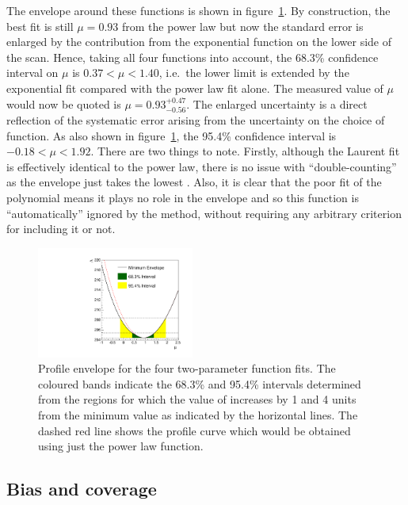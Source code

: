 The envelope around these functions is shown in
figure~\ref{fig:functions:envelope}.
By construction, the best fit is still $\mu=0.93$ from the power law
but now the standard error is enlarged by the contribution from the exponential function
on the lower side of the scan. Hence, taking all four functions into
account, the 68.3\% confidence interval on $\mu$ is
$0.37 < \mu < 1.40 $, i.e.~the lower limit is extended by
the exponential fit 
compared with the power law fit alone.
The measured value of $\mu$ would now be quoted is
$\mu = 0.93_{-0.56}^{+0.47}$.
The enlarged uncertainty is a direct reflection of the
systematic error arising from the uncertainty on the choice of function.
As also shown in figure~\ref{fig:functions:envelope}, the 95.4\% confidence
interval is $-0.18 < \mu < 1.92$.
There are two things to note. Firstly, although the Laurent fit
is effectively identical to the power law, there is no issue with
``double-counting'' as the envelope just takes the lowest \nll.
Also, it is clear that the poor fit of the polynomial
means it plays no role in the envelope and so this function is
``automatically'' ignored by the method,
without requiring any arbitrary criterion for
including it or not.
%
\begin{figure}[tbp]
\centering
\includegraphics[width=0.46\textwidth]{functions/Envelope.pdf}
\caption{Profile \nll envelope for the four two-parameter function fits.
The coloured bands indicate the 68.3\% and 95.4\% intervals determined from the regions
for which the value of \nll increases by 1 and 4 units from the minimum value as indicated by the horizontal lines. The dashed red line shows the profile \nll
curve which would be obtained using just the power law function.}
\label{fig:functions:envelope}
\end{figure}


\subsection{Bias and coverage}
\label{sec:functions:coverage}

